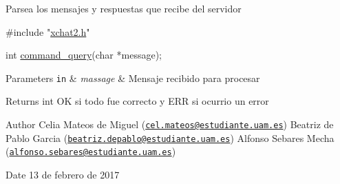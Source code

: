 Parsea los mensajes y respuestas que recibe del servidor


\begin{DoxyCode}
\textcolor{preprocessor}{#include "\hyperlink{xchat2_8h}{xchat2.h}"}

\textcolor{keywordtype}{int} \hyperlink{xchat2_8h_a41f93f364aea303a0c93177289733f92}{command\_query}(\textcolor{keywordtype}{char} *message);
\end{DoxyCode}



\begin{DoxyParams}[1]{Parameters}
\mbox{\tt in}  & {\em massage} & Mensaje recibido para procesar\\
\hline
\end{DoxyParams}
\begin{DoxyReturn}{Returns}
int O\-K si todo fue correcto y E\-R\-R si ocurrio un error
\end{DoxyReturn}
\begin{DoxyAuthor}{Author}
Celia Mateos de Miguel (\href{mailto:cel.mateos@estudiante.uam.es}{\tt cel.\-mateos@estudiante.\-uam.\-es}) Beatriz de Pablo Garcia (\href{mailto:beatriz.depablo@estudiante.uam.es}{\tt beatriz.\-depablo@estudiante.\-uam.\-es}) Alfonso Sebares Mecha (\href{mailto:alfonso.sebares@estudiante.uam.es}{\tt alfonso.\-sebares@estudiante.\-uam.\-es})
\end{DoxyAuthor}
\begin{DoxyDate}{Date}
13 de febrero de 2017
\end{DoxyDate}


 
